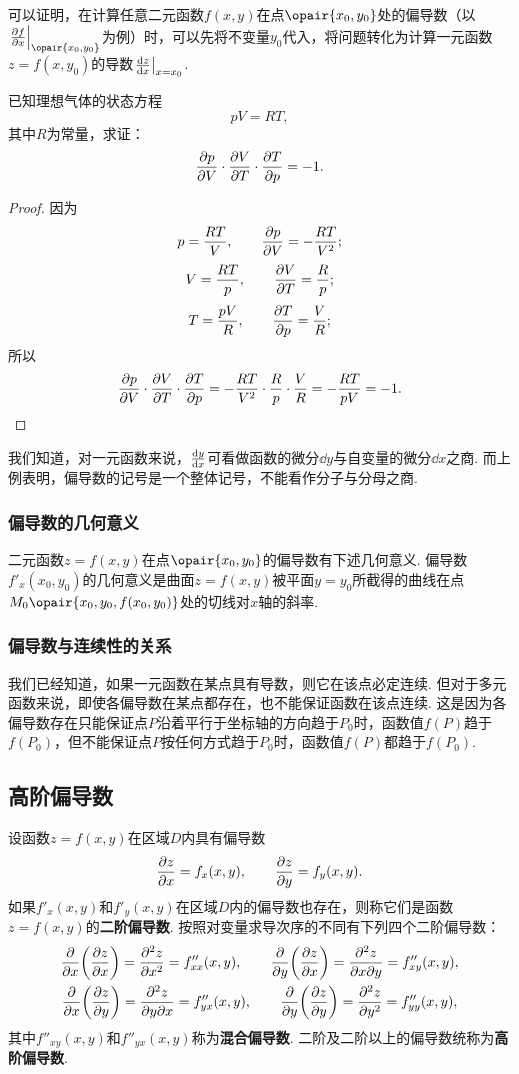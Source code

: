 可以证明，在计算任意二元函数\(f(x,y)\)在点\(\opair{x_0,y_0}\)处的偏导数（以\(\eval{\pdv{f}{x}}_{\opair{x_0,y_0}}\)为例）时，可以先将不变量\(y_0\)代入，将问题转化为计算一元函数\(z = f(x, y_0)\)的导数\(\eval{\dv{z}{x}}_{x=x_0}\).

\begin{example}
已知理想气体的状态方程\[
pV = RT,
\]其中\(R\)为常量，求证：\[
\pdv{p}{V} \cdot \pdv{V}{T} \cdot \pdv{T}{p} = -1.
\]
\begin{proof}
因为\[
p = \frac{RT}{V}, \qquad \pdv{p}{V} = -\frac{RT}{V^2};
\]\[
V = \frac{RT}{p}, \qquad \pdv{V}{T} = \frac{R}{p};
\]\[
T = \frac{pV}{R}, \qquad \pdv{T}{p} = \frac{V}{R};
\]所以\[
\pdv{p}{V} \cdot \pdv{V}{T} \cdot \pdv{T}{p}
= -\frac{RT}{V^2} \cdot \frac{R}{p} \cdot \frac{V}{R}
= -\frac{RT}{pV} = -1.
\qedhere
\]
\end{proof}
\end{example}

我们知道，对一元函数来说，\(\dv{y}{x}\)可看做函数的微分\(\dd{y}\)与自变量的微分\(\dd{x}\)之商.
而上例表明，偏导数的记号是一个整体记号，不能看作分子与分母之商.

\subsubsection{偏导数的几何意义}
二元函数\(z=f(x,y)\)在点\(\opair{x_0,y_0}\)的偏导数有下述几何意义.
偏导数\(f'_x(x_0,y_0)\)的几何意义是曲面\(z=f(x,y)\)被平面\(y=y_0\)所截得的曲线在点\(M_0\opair{x_0,y_0,f(x_0,y_0)}\)处的切线对\(x\)轴的斜率.

\subsubsection{偏导数与连续性的关系}
我们已经知道，如果一元函数在某点具有导数，则它在该点必定连续.
但对于多元函数来说，即使各偏导数在某点都存在，也不能保证函数在该点连续.
这是因为各偏导数存在只能保证点\(P\)沿着平行于坐标轴的方向趋于\(P_0\)时，函数值\(f(P)\)趋于\(f(P_0)\)，但不能保证点\(P\)按任何方式趋于\(P_0\)时，函数值\(f(P)\)都趋于\(f(P_0)\).

\subsection{高阶偏导数}
\begin{definition}
设函数\(z=f(x,y)\)在区域\(D\)内具有偏导数\[
\pdv{z}{x} = f_x(x,y), \qquad
\pdv{z}{y} = f_y(x,y).
\]如果\(f'_x(x,y)\)和\(f'_y(x,y)\)在区域\(D\)内的偏导数也存在，则称它们是函数\(z=f(x,y)\)的\textbf{二阶偏导数}.
按照对变量求导次序的不同有下列四个二阶偏导数：
\begin{gather*}
\pdv{x}(\pdv{z}{x}) = \pdv[2]{z}{x} = f''_{xx}(x,y),
\qquad
\pdv{y}(\pdv{z}{x}) = \pdv{z}{x}{y} = f''_{xy}(x,y), \\
\pdv{x}(\pdv{z}{y}) = \pdv{z}{y}{x} = f''_{yx}(x,y),
\qquad
\pdv{y}(\pdv{z}{y}) = \pdv[2]{z}{y} = f''_{yy}(x,y),
\end{gather*}
其中\(f''_{xy}(x,y)\)和\(f''_{yx}(x,y)\)称为\textbf{混合偏导数}.
二阶及二阶以上的偏导数统称为\textbf{高阶偏导数}.
\end{definition}

